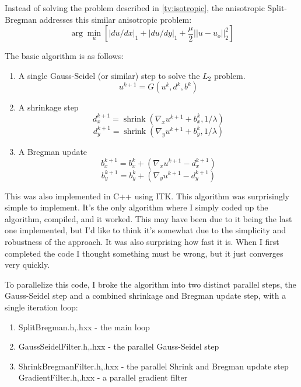 \documentclass[11pt]{article}
\DeclareMathOperator{\shrink}{shrink}
\begin{document}
Instead of solving the problem described in \ref{tv:isotropic}, the anisotropic Split-Bregman addresses this similar anisotropic problem:
\begin{equation}
\arg \min_{u}\left[ |du/dx|_1 + |du/dy|_1 + \frac{\mu}{2}||u-u_o||^2_2 \right]
\label{tv:anisotropic}
\end{equation}

The basic algorithm is as follows:
\begin{enumerate}
\item A single Gauss-Seidel (or similar) step to solve the $L_2$ problem.
\begin{equation*}
u^{k+1} = G(u^k,d^k,b^k)
\end{equation*}
\item A shrinkage step
\begin{equation*}
d^{k+1}_x = \shrink(\nabla_x u^{k+1} + b^k_x, 1/\lambda)
\end{equation*}
\begin{equation*}
d^{k+1}_y = \shrink(\nabla_y u^{k+1} + b^k_y, 1/\lambda)
\end{equation*}
\item A Bregman update
\begin{equation*}
b^{k+1}_x = b^k_x + (\nabla_x u^{k+1} - d^{k+1}_x)
\end{equation*}
\begin{equation*}
b^{k+1}_y = b^k_y + (\nabla_y u^{k+1} - d^{k+1}_y)
\end{equation*}

\end{enumerate}

This was also implemented in C++ using ITK.
This algorithm was surprisingly simple to implement.
It's the only algorithm where I simply coded up the algorithm, compiled, and it worked.
This may have been due to it being the last one implemented, but I'd like to think it's somewhat due to the simplicity and robustness of the approach.
It was also surprising how fast it is.  
When I first completed the code I thought something must be wrong, but it just converges very quickly.

To parallelize this code, I broke the algorithm into two distinct parallel steps, the Gauss-Seidel step and a combined shrinkage and Bregman update step, with a single iteration loop:

\begin{enumerate}
\item SplitBregman.h,.hxx - the main loop
\item GaussSeidelFilter.h,.hxx - the parallel Gauss-Seidel step
\item ShrinkBregmanFilter.h,.hxx - the parallel Shrink and Bregman update step
GradientFilter.h,.hxx - a parallel gradient filter
\end{enumerate}
\end{document}
